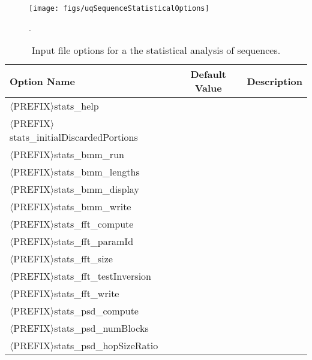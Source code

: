 \begin{figure}[htpb]
\centering
\texttt{[image: figs/uqSequenceStatisticalOptions]}
\vspace*{-8pt}
\caption{{\color{red}{The sequence statistical options class}}.}
\label{fig-seq-statistical-options-class}
\end{figure}

\begin{table}[htpb]
\begin{center}
\caption{Input file options for a the statistical analysis of sequences.}
\ttfamily
\begin{tabular}{l|c|c}
\toprule
\rmfamily Option Name  & \rmfamily Default Value & \rmfamily Description \\
\midrule\midrule
$\langle$PREFIX$\rangle$stats\_help                      &         &             \\
$\langle$PREFIX$\rangle$stats\_initialDiscardedPortions  &         &             \\
\hline
$\langle$PREFIX$\rangle$stats\_bmm\_run                   &         &             \\
$\langle$PREFIX$\rangle$stats\_bmm\_lengths               &         &             \\
$\langle$PREFIX$\rangle$stats\_bmm\_display               &         &             \\
$\langle$PREFIX$\rangle$stats\_bmm\_write                 &         &             \\
\hline
$\langle$PREFIX$\rangle$stats\_fft\_compute               &         &             \\
$\langle$PREFIX$\rangle$stats\_fft\_paramId               &         &             \\
$\langle$PREFIX$\rangle$stats\_fft\_size                  &         &             \\
$\langle$PREFIX$\rangle$stats\_fft\_testInversion         &         &             \\
$\langle$PREFIX$\rangle$stats\_fft\_write                 &         &             \\
\hline
$\langle$PREFIX$\rangle$stats\_psd\_compute               &         &             \\
$\langle$PREFIX$\rangle$stats\_psd\_numBlocks             &         &             \\
$\langle$PREFIX$\rangle$stats\_psd\_hopSizeRatio          &         &             \\

\end{tabular}
\end{center}
\end{table}

